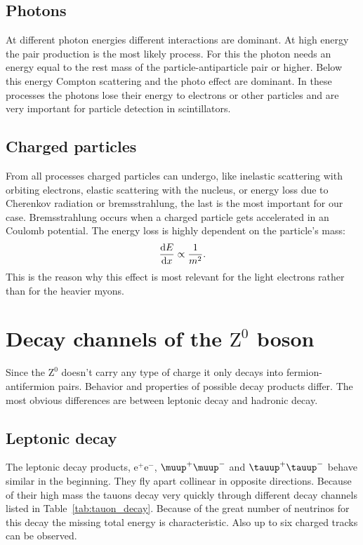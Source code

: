 \documentclass[11pt, english, fleqn, DIV=15, headinclude, BCOR=2cm]{scrreprt}
\begin{document}
\subsection{Photons}

At different photon energies different interactions are dominant. At high
energy the pair production is the most likely process. For
this the photon needs an energy equal to the rest mass of the
particle-antiparticle pair or higher. Below this energy Compton scattering and
the photo effect are dominant. In these processes the photons lose their
energy to electrons or other particles and are very important for particle
detection in scintillators.

\subsection{Charged particles}

From all processes charged particles can undergo, like inelastic scattering
with orbiting electrons, elastic scattering with the nucleus, or energy
loss due to Cherenkov radiation or bremsstrahlung, the last is the most
important for our case. Bremsstrahlung occurs when a charged particle gets
accelerated in an Coulomb potential. The energy loss is highly dependent on
the particle's mass:
\[
        \frac{\mathop{}\!\mathrm d {E}}{\mathop{}\!\mathrm d {x}} \propto \frac 1{m^2}.
\]
This is the reason why this effect is most relevant for the light electrons
rather than for the heavier myons.

\section{Decay channels of the $\mathrm Z^0$ boson}

Since the $\mathrm Z^0$ doesn't carry any type of charge it only decays into
fermion-antifermion pairs. Behavior and properties of possible decay products
differ. The most obvious differences are between leptonic decay and hadronic
decay.

\subsection{Leptonic decay}

The leptonic decay products, $\mathrm e^+ \mathrm e^-$, $\muup^+ \muup^-$
and $\tauup^+ \tauup^-$ behave similar in the beginning. They fly apart
collinear in opposite directions. Because of their high mass the tauons decay
very quickly through different decay channels listed in
Table~\ref{tab:tauon_decay}. Because of the great number of neutrinos for this
decay the missing total energy is characteristic. Also up to six charged tracks
can be observed.
\end{document}
